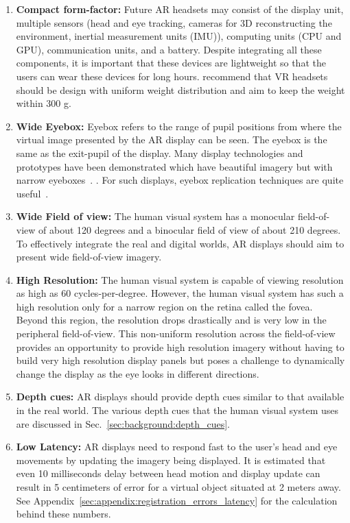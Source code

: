 \begin{enumerate}
    \item \textbf{Compact form-factor:} Future AR headsets may consist of the display unit, multiple sensors (head and eye tracking, cameras for 3D reconstructing the environment, inertial measurement units (IMU)), computing units (CPU and GPU), communication units, and a battery. Despite integrating all these components, it is important that these devices are lightweight so that the users can wear these devices for long hours. \cite{yan2018effects} recommend that VR headsets should be design with uniform weight distribution and aim to keep the weight within 300 g.
    \item \textbf{Wide Eyebox:} Eyebox refers to the range of pupil positions from where the virtual image presented by the AR display can be seen. The eyebox is the same as the exit-pupil of the display. Many display technologies and prototypes have been demonstrated which have beautiful imagery but with narrow eyeboxes~\cite{Maimone2017Holographic}. . For such displays, eyebox replication techniques are quite useful~\cite{Jang2017Retinal}. 
    \item \textbf{Wide Field of view:} The human visual system has a monocular field-of-view of about 120 degrees and a binocular field of view of about 210 degrees. To effectively integrate the real and digital worlds, AR displays should aim to present wide field-of-view imagery.
    \item \textbf{High Resolution:} The human visual system is capable of viewing resolution as high as 60 cycles-per-degree. However, the human visual system has such a high resolution only for a narrow region on the retina called the fovea. Beyond this region, the resolution drops drastically and is very low in the peripheral field-of-view. This non-uniform resolution across the field-of-view provides an opportunity to provide high resolution imagery without having to build very high resolution display panels but poses a challenge to dynamically change the display as the eye looks in different directions.
    \item \textbf{Depth cues:} AR displays should provide depth cues similar to that available in the real world. The various depth cues that the human visual system uses are discussed in Sec.~\ref{sec:background:depth_cues}. 
    \item \textbf{Low Latency:} AR displays need to respond fast to the user’s head and eye movements by updating the imagery being displayed. It is estimated that even 10 milliseconds delay between head motion and display update can result in 5 centimeters of error for a virtual object situated at 2 meters away. See Appendix~\ref{sec:appendix:registration_errors_latency} for the calculation behind these numbers.
\end{enumerate}

